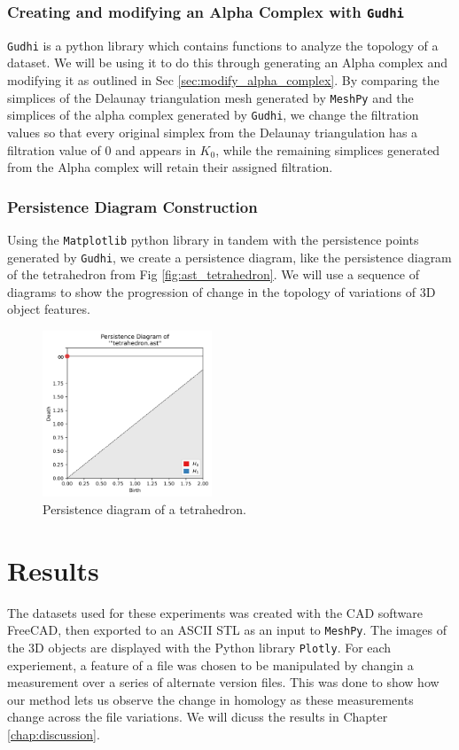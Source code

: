 \documentclass[ma]{uncgdissertationexp}
\theoremstyle{plain}
\theoremstyle{definition}
\theoremstyle{remark}
\begin{document}
\cprotect\subsection{Creating and modifying an Alpha Complex with \verb+Gudhi+}
\par \verb"Gudhi" is a python library which contains functions to analyze the topology of a dataset. We will be using it to do this through generating an Alpha complex and modifying it as outlined in Sec \ref{sec:modify_alpha_complex}. By comparing the simplices of the Delaunay triangulation mesh generated by \verb"MeshPy" and the simplices of the alpha complex generated by \verb"Gudhi", we change the filtration values so that every original simplex from the Delaunay triangulation has a filtration value of 0 and appears in $K_{0}$, while the remaining simplices generated from the Alpha complex will retain their assigned filtration.

\subsection{Persistence Diagram Construction}
\par Using the \verb"Matplotlib" python library in tandem with the persistence points generated by \verb"Gudhi", we create a persistence diagram, like the persistence diagram of the tetrahedron from Fig \ref{fig:ast_tetrahedron}. We will use a sequence of diagrams to show the progression of change in the topology of variations of 3D object features.
\begin{figure}[H]
    \begin{center}
	    \includegraphics[width=0.45\textwidth]{tetrahedron persdia.png}
    	\caption{Persistence diagram of a tetrahedron.}
    \end{center}
\end{figure}

\chapter{Results}
\par The datasets used for these experiments was created with the CAD software FreeCAD, then exported to an ASCII STL as an input to \verb"MeshPy". The images of the 3D objects are displayed with the Python library \verb"Plotly". For each experiement, a feature of a file was chosen to be manipulated by changin a measurement over a series of alternate version files. This was done to show how our method lets us observe the change in homology as these measurements change across the file variations. We will dicuss the results in Chapter \ref{chap:discussion}.
\end{document}
